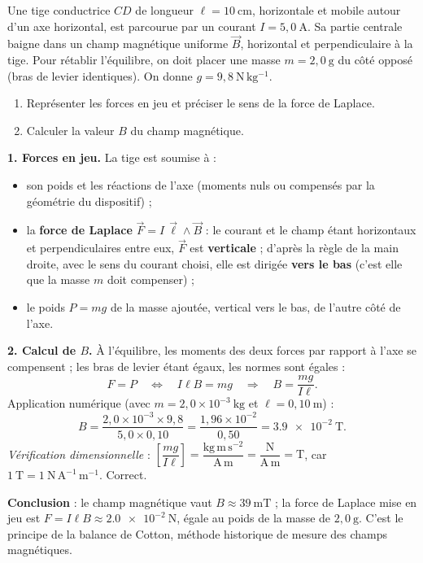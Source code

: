 \documentclass[11pt]{article}
\begin{document}
\begin{exoresolu}
Une tige conductrice $CD$ de longueur $\ell = 10\ \mathrm{cm}$, horizontale et mobile autour d'un axe horizontal, est parcourue par un courant $I = 5,0\ \mathrm{A}$. Sa partie centrale baigne dans un champ magnétique uniforme $\vec{B}$, horizontal et perpendiculaire à la tige. Pour rétablir l'équilibre, on doit placer une masse $m = 2,0\ \mathrm{g}$ du côté opposé (bras de levier identiques). On donne $g = 9,8\ \mathrm{N\,kg^{-1}}$.
\begin{enumerate}
\item Représenter les forces en jeu et préciser le sens de la force de Laplace.
\item Calculer la valeur $B$ du champ magnétique.
\end{enumerate}
\tcblower
\textbf{1. Forces en jeu.} La tige est soumise à :
\begin{itemize}
\item son poids et les réactions de l'axe (moments nuls ou compensés par la géométrie du dispositif) ;
\item la \textbf{force de Laplace} $\vec{F} = I\,\vec{\ell} \wedge \vec{B}$ : le courant et le champ étant horizontaux et perpendiculaires entre eux, $\vec{F}$ est \textbf{verticale} ; d'après la règle de la main droite, avec le sens du courant choisi, elle est dirigée \textbf{vers le bas} (c'est elle que la masse $m$ doit compenser) ;
\item le poids $P = mg$ de la masse ajoutée, vertical vers le bas, de l'autre côté de l'axe.
\end{itemize}

\textbf{2. Calcul de $B$.} À l'équilibre, les moments des deux forces par rapport à l'axe se compensent ; les bras de levier étant égaux, les normes sont égales :
\[ F = P \quad\Longleftrightarrow\quad I\ell B = mg \quad\Longrightarrow\quad B = \dfrac{mg}{I\ell}. \]
Application numérique (avec $m = 2,0\times 10^{-3}\ \mathrm{kg}$ et $\ell = 0,10\ \mathrm{m}$) :
\[ B = \dfrac{2,0\times 10^{-3} \times 9,8}{5,0 \times 0,10} = \dfrac{1,96\times 10^{-2}}{0,50} = \num{3,9e-2}\ \mathrm{T}. \]
\textit{Vérification dimensionnelle} : $\left[\dfrac{mg}{I\ell}\right] = \dfrac{\mathrm{kg\,m\,s^{-2}}}{\mathrm{A\,m}} = \dfrac{\mathrm{N}}{\mathrm{A\,m}} = \mathrm{T}$, car $1\ \mathrm{T} = 1\ \mathrm{N\,A^{-1}\,m^{-1}}$. Correct.

\textbf{Conclusion} : le champ magnétique vaut $B \approx 39\ \mathrm{mT}$ ; la force de Laplace mise en jeu est $F = I\ell B \approx \num{2,0e-2}\ \mathrm{N}$, égale au poids de la masse de $2,0\ \mathrm{g}$. C'est le principe de la balance de Cotton, méthode historique de mesure des champs magnétiques.
\end{exoresolu}
\end{document}
